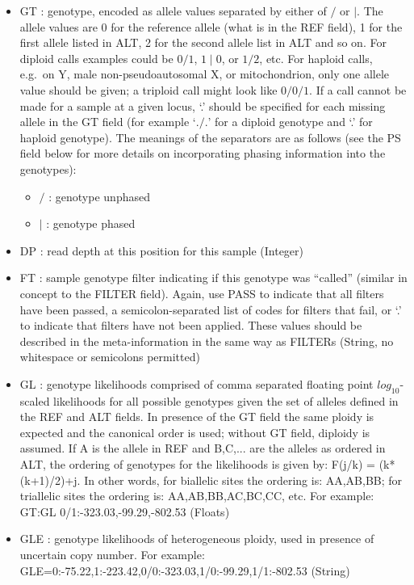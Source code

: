 \documentclass[8pt]{article}
\begin{document}
\begin{itemize}
\renewcommand{\labelitemii}{$\circ$}
  \item GT : genotype, encoded as allele values separated by either of $/$ or $\mid$. The allele values are 0 for the reference allele (what is in the REF field), 1 for the first allele listed in ALT, 2 for the second allele list in ALT and so on. For diploid calls examples could be $0/1$, $1\mid0$, or $1/2$, etc. For haploid calls, e.g.\ on Y, male non-pseudoautosomal X, or mitochondrion, only one allele value should be given; a triploid call might look like $0/0/1$. If a call cannot be made for a sample at a given locus, `.' should be specified for each missing allele in the GT field (for example `$./.$' for a diploid genotype and `.' for haploid genotype). The meanings of the separators are as follows (see the PS field below for more details on incorporating phasing information into the genotypes):
	\begin{itemize}
	  \item $/$ : genotype unphased
	  \item $\mid$ : genotype phased
	\end{itemize}
  \item DP : read depth at this position for this sample (Integer)
  \item FT : sample genotype filter indicating if this genotype was ``called'' (similar in concept to the FILTER field). Again, use PASS to indicate that all filters have been passed, a semicolon-separated list of codes for filters that fail, or `.' to indicate that filters have not been applied. These values should be described in the meta-information in the same way as FILTERs (String, no whitespace or semicolons permitted)
  \item GL : genotype likelihoods comprised of comma separated floating point $log_{10}$-scaled likelihoods for all possible genotypes given the set of alleles defined in the REF and ALT fields. In presence of the GT field the same ploidy is expected and the canonical order is used; without GT field, diploidy is assumed. If A is the allele in REF and B,C,... are the alleles as ordered in ALT, the ordering of genotypes for the likelihoods is given by: F(j/k) = (k*(k+1)/2)+j.  In other words, for biallelic sites the ordering is: AA,AB,BB; for triallelic sites the ordering is: AA,AB,BB,AC,BC,CC, etc.  For example: GT:GL 0/1:-323.03,-99.29,-802.53 (Floats)
  \item GLE : genotype likelihoods of heterogeneous ploidy, used in presence of uncertain copy number. For example: GLE=0:-75.22,1:-223.42,0/0:-323.03,1/0:-99.29,1/1:-802.53 (String)

\end{itemize}
\end{document}
